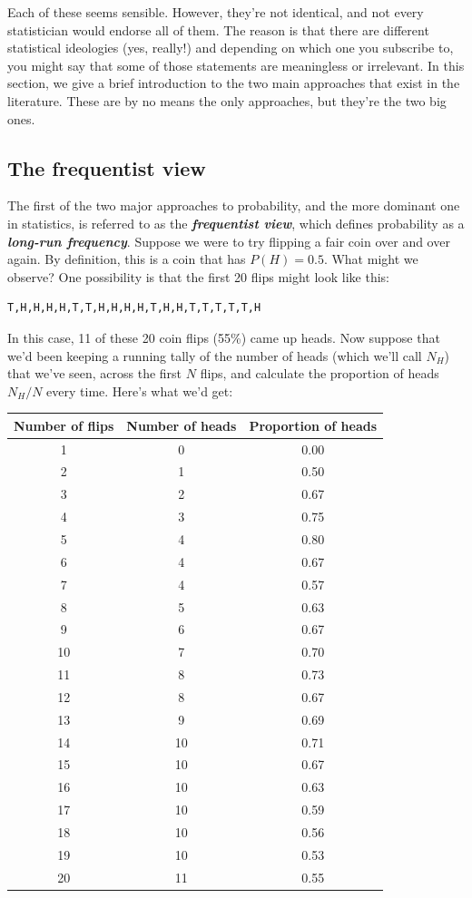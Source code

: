 \documentclass[
]{book}
\theoremstyle{definition}
\theoremstyle{definition}
\theoremstyle{definition}
\theoremstyle{definition}
\theoremstyle{remark}
\begin{document}
Each of these seems sensible. However, they're not identical, and not every statistician would endorse all of them. The reason is that there are different statistical ideologies (yes, really!) and depending on which one you subscribe to, you might say that some of those statements are meaningless or irrelevant. In this section, we give a brief introduction to the two main approaches that exist in the literature. These are by no means the only approaches, but they're the two big ones.

\hypertarget{the-frequentist-view}{%
\subsection{The frequentist view}\label{the-frequentist-view}}

The first of the two major approaches to probability, and the more dominant one in statistics, is referred to as the \textbf{\emph{frequentist view}}, which defines probability as a \textbf{\emph{long-run frequency}}. Suppose we were to try flipping a fair coin over and over again. By definition, this is a coin that has \(P(H) = 0.5\). What might we observe? One possibility is that the first 20 flips might look like this:

\begin{verbatim}
T,H,H,H,H,T,T,H,H,H,H,T,H,H,T,T,T,T,T,H
\end{verbatim}

In this case, 11 of these 20 coin flips (55\%) came up heads. Now suppose that we'd been keeping a running tally of the number of heads (which we'll call \(N_H\)) that we've seen, across the first \(N\) flips, and calculate the proportion of heads \(N_H / N\) every time. Here's what we'd get:

\begin{longtable}[]{@{}ccc@{}}
\toprule()
Number of flips & Number of heads & Proportion of heads \\
\midrule()
\endhead
1 & 0 & 0.00 \\
2 & 1 & 0.50 \\
3 & 2 & 0.67 \\
4 & 3 & 0.75 \\
5 & 4 & 0.80 \\
6 & 4 & 0.67 \\
7 & 4 & 0.57 \\
8 & 5 & 0.63 \\
9 & 6 & 0.67 \\
10 & 7 & 0.70 \\
11 & 8 & 0.73 \\
12 & 8 & 0.67 \\
13 & 9 & 0.69 \\
14 & 10 & 0.71 \\
15 & 10 & 0.67 \\
16 & 10 & 0.63 \\
17 & 10 & 0.59 \\
18 & 10 & 0.56 \\
19 & 10 & 0.53 \\
20 & 11 & 0.55 \\
\bottomrule()
\end{longtable}
\end{document}

